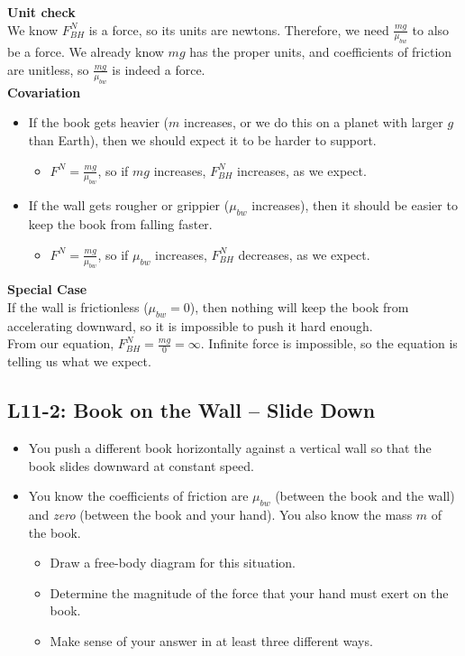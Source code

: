 \documentclass[]{article}
\newcommand{\Week}{11}
\begin{document}
\begin{TeacherMargin}
\noindent\textbf{Unit check} \\
We know $F^{N}_{BH}$ is a force, so its units are newtons. Therefore, we need $\frac{mg}{\mu_{bw}}$ to also be a force. We already know $mg$ has the proper units, and coefficients of friction are unitless, so $\frac{mg}{\mu_{bw}}$ is indeed a force. \\
\textbf{Covariation}
\begin{itemize}
	\item If the book gets heavier ($m$ increases, or we do this on a planet with larger $g$ than Earth), then we should expect it to be harder to support.
	\begin{itemize}
		\item $F^{N}=\frac{mg}{\mu_{bw}}$, so if $mg$ increases, $F^{N}_{BH}$ increases, as we expect.
	\end{itemize}
	\item If the wall gets rougher or grippier ($\mu_{bw}$ increases), then it should be easier to keep the book from falling faster.
	\begin{itemize}
		\item $F^{N}=\frac{mg}{\mu_{bw}}$, so if $\mu_{bw}$ increases, $F^{N}_{BH}$ decreases, as we expect.
	\end{itemize}
\end{itemize}
\textbf{Special Case} \\
If the wall is frictionless ($\mu_{bw}=0$), then nothing will keep the book from accelerating downward, so it is impossible to push it hard enough. \\
From our equation, $F^{N}_{BH} = \frac{mg}{0} = \infty$. Infinite force is impossible, so the equation is telling us what we expect.
\end{TeacherMargin}
\begin{PresentSpace}
\vspace{-10pt}
\section*{L\Week-2: Book on the Wall -- Slide Down}
\vspace{-10pt}
\begin{itemize}
	\item You push a different book horizontally against a vertical wall so that the book slides downward at constant speed.
	\item You know the coefficients of friction are $\mu_{bw}$ (between the book and the wall) and \textit{zero} (between the book and your hand). You also know the mass $m$ of the book.
	\begin{itemize}
		\item Draw a free-body diagram for this situation.
		\item Determine the magnitude of the force that your hand must exert on the book.
		\item Make sense of your answer in at least three different ways.
	\end{itemize}
\end{itemize}
\end{PresentSpace}
\end{document}
